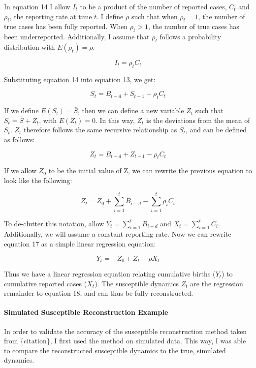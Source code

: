\documentclass{article}
\begin{document}
In equation 14 I allow $I_{t}$ to be a product of the number of reported cases, $C_{t}$ and $\rho_{t}$, the reporting rate at time $t$. I define $\rho$ such that when $\rho_{t} =1$, the number of true cases has been fully reported. When $\rho_{t} > 1$, the number of true cases has been underreported. Additionally, I assume that $\rho_{t}$ follows a probability distribution with  $E(\rho_{t}) = \rho$.

\begin{equation}
I_{t} = \rho_{t}C_{t}
\end{equation}

Substituting equation 14 into equation 13, we get: 

\begin{equation}
S_{t} = B_{t-d} + S_{t-1} -  \rho_{t} C_{t}
\end{equation}

If we define $E(S_{t})=\bar{S}$, then we can define a new variable $Z_{t}$ such that $S_{t} = \bar{S} + Z_{t}$, with $E(Z_{t})=0$. In this way, $Z_{t}$ is the deviations from the mean of $S_{t}$. $Z_{t}$ therefore follows the same recursive relationship as $S_{t}$, and can be defined as follows:

\begin{equation}
Z_{t} = B_{t-d} + Z_{t-1} -  \rho_{t} C_{t}
\end{equation}

If we allow $Z_{0}$ to be the initial value of Z, we can rewrite the previous equation to look like the following:

\begin{equation}
Z_{t} = Z_{0} + \sum_{i=1}^{t} B_{i-d} - \sum_{i=1}^{t} \rho_{i}C_{i}
\end{equation}

To de-clutter this notation, allow $Y_{t}=\sum_{i=1}^{t} B_{i-d}$ and $X_{t}= \sum_{i=1}^{t}C_{i}$. Additionally, we will assume a constant reporting rate. Now we can rewrite equation 17 as a simple linear regression equation:

\begin{equation}
Y_{t} = -Z_{0} + Z_{t} + \rho X_{t}
\end{equation}

Thus we have a linear regression equation relating cumulative births ($Y_{t}$) to cumulative reported cases ($X_{t}$). The susceptible dynamics $Z_{t}$ are the regression remainder to equation 18, and can thus be fully reconstructed. 

\paragraph{Simulated Susceptible Reconstruction Example}
In order to validate the accuracy of the susceptible reconstruction method taken from \{citation\}, I first used the method on simulated data. This way, I was able to compare the reconstructed susceptible dynamics to the true, simulated dynamics. 
\end{document}
